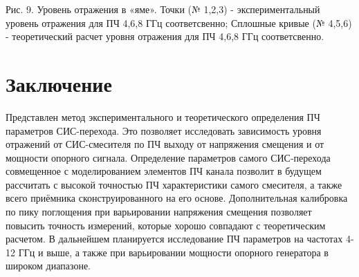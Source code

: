 \documentclass[a4paper]{article}
\begin{document}
Рис. 9. Уровень отражения в «яме». Точки (№ 1,2,3) - экспериментальный уровень отражения для ПЧ 4,6,8 ГГц соответсвенно; Сплошные кривые (№ 4,5,6) - теоретический расчет уровня отражения для ПЧ 4,6,8 ГГц соответсвенно.

\section{Заключение}
Представлен метод экспериментального и теоретического определения ПЧ параметров СИС-перехода. Это позволяет исследовать зависимость уровня отражений от СИС-смесителя по ПЧ выходу от напряжения смещения и от мощности опорного сигнала. Определение параметров самого СИС-перехода совмещенное с моделированием элементов ПЧ канала позволит в будущем рассчитать с высокой точностью ПЧ характеристики самого смесителя, а также всего приёмника сконструированного на его основе. Дополнительная калибровка по пику поглощения при варьировании напряжения смещения позволяет повысить точность измерений, которые хорошо совпадают с теоретическим расчетом.
В дальнейшем планируется исследование ПЧ параметров на частотах 4-12 ГГц и выше, а также при варьировании мощности опорного генератора в широком диапазоне.
\end{document}
